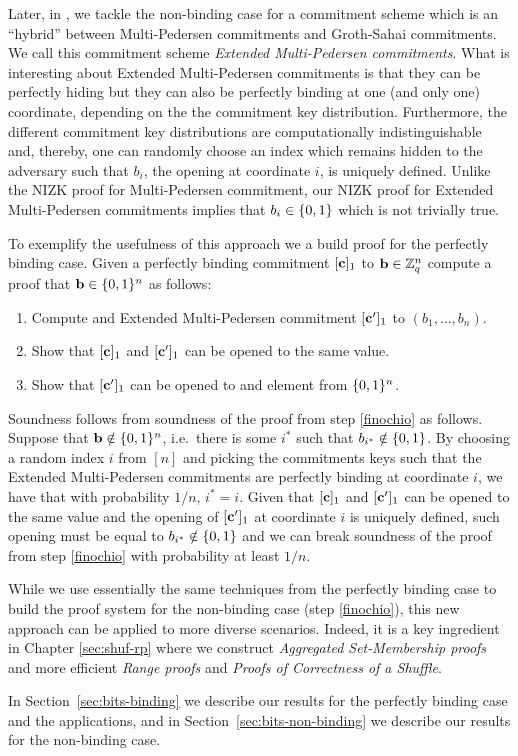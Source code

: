 Later, in \cite{ACNS:GonRaf16}, we tackle the non-binding case for a commitment scheme which is an ``hybrid'' between Multi-Pedersen commitments and Groth-Sahai commitments. We call this commitment scheme \emph{Extended Multi-Pedersen commitments}. What is interesting about Extended Multi-Pedersen commitments is that they can be perfectly hiding but they can also be perfectly binding at one (and only one) coordinate, depending on the the commitment key distribution. Furthermore, the different commitment key distributions are computationally indistinguishable and, thereby, one can randomly choose an index which remains hidden to the adversary such that $b_i$, the opening at coordinate $i$, is uniquely defined. Unlike the NIZK proof for Multi-Pedersen commitment, our NIZK proof for Extended Multi-Pedersen commitments implies that $b_i\in\{0,1\}$ which is not trivially true.

To exemplify the usefulness of this approach we a build proof for the perfectly binding case. Given a perfectly binding commitment $[\mathbf{c}]_1$ to $\mathbf{b}\in\mathbb{Z}_q^n$ compute a proof that $\mathbf{b}\in\{0,1\}^n$ as follows:
\begin{enumerate}
\item Compute and Extended Multi-Pedersen commitment $[\mathbf{c}']_1$ to $(b_1,\ldots,b_n)$.
\item Show that $[\mathbf{c}]_1$ and $[\mathbf{c}']_1$  can be opened to the same value.
\item Show that $[\mathbf{c}']_1$ can be opened to and element from $\{0,1\}^n$. \label{finochio}
\end{enumerate}
Soundness follows from soundness of the proof from step \ref{finochio} as follows. Suppose that $\mathbf{b}\notin \{0,1\}^n$, i.e.~there is some $i^*$ such that $b_{i^*}\notin\{0,1\}$. By choosing a random index $i$ from $[n]$ and picking the commitments keys such that the Extended Multi-Pedersen commitments are perfectly binding at coordinate $i$, we have that with probability $1/n$, $i^*=i$. Given that $[\mathbf{c}]_1$ and $[\mathbf{c}']_1$ can be opened to the same value and the opening of $[\mathbf{c}']_1$ at coordinate $i$ is uniquely defined, such opening must be equal to $b_{i^*}\notin\{0,1\}$ and we can break soundness of the proof from step \ref{finochio} with probability at least $1/n$.
 
While we use essentially the same techniques from the perfectly binding case to build the proof system for the non-binding case (step \ref{finochio}), this new approach can be applied to more diverse scenarios. Indeed, it is a key ingredient in Chapter \ref{sec:shuf-rp} where we construct \emph{Aggregated Set-Membership proofs} and more efficient \emph{Range proofs} and \emph{Proofs of Correctness of a Shuffle}.

In Section~\ref{sec:bits-binding} we describe our results for the perfectly binding case and the applications, and in Section~\ref{sec:bits-non-binding} we describe our results for the non-binding case.
